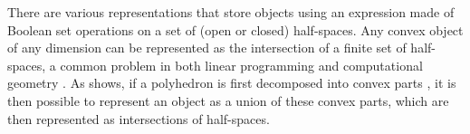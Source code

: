 There are various representations that store objects using an expression made of Boolean set operations on a set of (open or closed) half-spaces.
Any convex object of any dimension can be represented as the intersection of a finite set of half-spaces, a common problem in both linear programming and computational geometry \citep{Shamos76,Preparata79}.
As  shows, if a polyhedron is first decomposed into convex parts \citep{Chazelle79,Bajaj90}, it is then possible to represent an object as a union of these convex parts, which are then represented as intersections of half-spaces.
\begin{figure}[tbp]
\centering
{}
\subfloat[]{
}
\end{figure}
